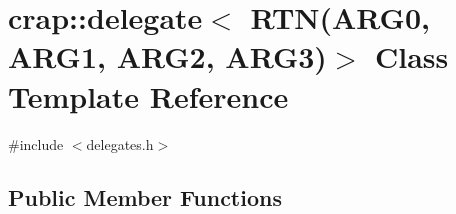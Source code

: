 \hypertarget{classcrap_1_1delegate_3_01_r_t_n_07_a_r_g0_00_01_a_r_g1_00_01_a_r_g2_00_01_a_r_g3_08_4}{}\section{crap\+:\+:delegate$<$ R\+T\+N(A\+R\+G0, A\+R\+G1, A\+R\+G2, A\+R\+G3)$>$ Class Template Reference}
\label{classcrap_1_1delegate_3_01_r_t_n_07_a_r_g0_00_01_a_r_g1_00_01_a_r_g2_00_01_a_r_g3_08_4}


{\ttfamily \#include $<$delegates.\+h$>$}

\subsection*{Public Member Functions}
